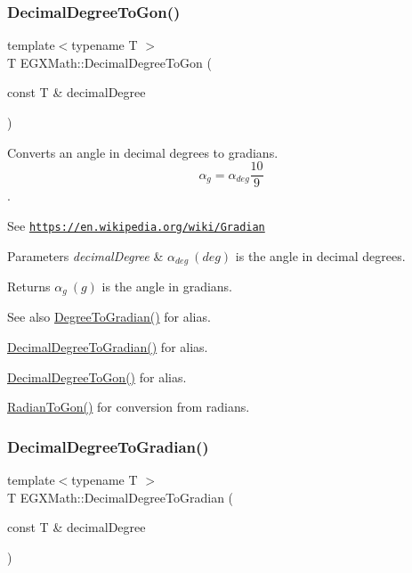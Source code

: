 \subsubsection{\texorpdfstring{Decimal\+Degree\+To\+Gon()}{DecimalDegreeToGon()}}
{\footnotesize\ttfamily template$<$typename T $>$ \\
T E\+G\+X\+Math\+::\+Decimal\+Degree\+To\+Gon (\begin{DoxyParamCaption}\item[{const T \&}]{decimal\+Degree }\end{DoxyParamCaption})}



Converts an angle in decimal degrees to gradians. \[\alpha_{g}=\alpha_{deg}\frac{10}{9}\]. 

See \href{https://en.wikipedia.org/wiki/Gradian}{\tt https\+://en.\+wikipedia.\+org/wiki/\+Gradian} 
\begin{DoxyParams}{Parameters}
{\em decimal\+Degree} & $\alpha_{deg}\ (deg)$ is the angle in decimal degrees. \\
\hline
\end{DoxyParams}
\begin{DoxyReturn}{Returns}
$\alpha_{g}\ (g)$ is the angle in gradians. 
\end{DoxyReturn}
\begin{DoxySeeAlso}{See also}
\mbox{\hyperlink{group___e_g_x_math-_angle_conversions-_degree_ga25bb5506b3f66fff7a1b85bf7bd795b3}{Degree\+To\+Gradian()}} for alias. 

\mbox{\hyperlink{group___e_g_x_math-_angle_conversions-_decimal_degree_ga3ac6f1ceb36a4938cdf3b55554734c99}{Decimal\+Degree\+To\+Gradian()}} for alias. 

\mbox{\hyperlink{group___e_g_x_math-_angle_conversions-_decimal_degree_gaeb333a1ad0aeb913c025fbd1be85fcb3}{Decimal\+Degree\+To\+Gon()}} for alias. 

\mbox{\hyperlink{group___e_g_x_math-_angle_conversions-_radian_ga36912e5a810b64c271c4dafc17f4ca45}{Radian\+To\+Gon()}} for conversion from radians. 
\end{DoxySeeAlso}
\mbox{\label{group___e_g_x_math-_angle_conversions-_decimal_degree_ga3ac6f1ceb36a4938cdf3b55554734c99}} 
\subsubsection{\texorpdfstring{Decimal\+Degree\+To\+Gradian()}{DecimalDegreeToGradian()}}
{\footnotesize\ttfamily template$<$typename T $>$ \\
T E\+G\+X\+Math\+::\+Decimal\+Degree\+To\+Gradian (\begin{DoxyParamCaption}\item[{const T \&}]{decimal\+Degree }\end{DoxyParamCaption})}



